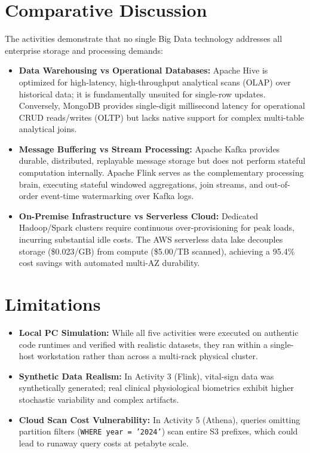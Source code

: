 \documentclass[12pt,a4paper]{report}
\begin{document}
\section{Comparative Discussion}
The activities demonstrate that no single Big Data technology addresses all enterprise storage and processing demands:
\begin{itemize}
    \item \textbf{Data Warehousing vs Operational Databases:} Apache Hive is optimized for high-latency, high-throughput analytical scans (OLAP) over historical data; it is fundamentally unsuited for single-row updates. Conversely, MongoDB provides single-digit millisecond latency for operational CRUD reads/writes (OLTP) but lacks native support for complex multi-table analytical joins.
    \item \textbf{Message Buffering vs Stream Processing:} Apache Kafka provides durable, distributed, replayable message storage but does not perform stateful computation internally. Apache Flink serves as the complementary processing brain, executing stateful windowed aggregations, join streams, and out-of-order event-time watermarking over Kafka logs.
    \item \textbf{On-Premise Infrastructure vs Serverless Cloud:} Dedicated Hadoop/Spark clusters require continuous over-provisioning for peak loads, incurring substantial idle costs. The AWS serverless data lake decouples storage (\$0.023/GB) from compute (\$5.00/TB scanned), achieving a 95.4\% cost savings with automated multi-AZ durability.
\end{itemize}

\section{Limitations}
\begin{itemize}
    \item \textbf{Local PC Simulation:} While all five activities were executed on authentic code runtimes and verified with realistic datasets, they ran within a single-host workstation rather than across a multi-rack physical cluster.
    \item \textbf{Synthetic Data Realism:} In Activity 3 (Flink), vital-sign data was synthetically generated; real clinical physiological biometrics exhibit higher stochastic variability and complex artifacts.
    \item \textbf{Cloud Scan Cost Vulnerability:} In Activity 5 (Athena), queries omitting partition filters (\texttt{WHERE year = '2024'}) scan entire S3 prefixes, which could lead to runaway query costs at petabyte scale.
\end{itemize}
\end{document}
